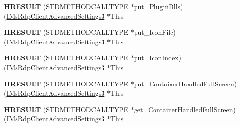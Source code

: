 \begin{DoxyCompactItemize}
\mbox{\label{struct_m_s_t_s_c_lib_1_1_i_ms_rdp_client_advanced_settings3_vtbl_a991d044da481aa66d441ab016e693aa0}} 
{\bfseries H\+R\+E\+S\+U\+LT} (S\+T\+D\+M\+E\+T\+H\+O\+D\+C\+A\+L\+L\+T\+Y\+PE $\ast$put\+\_\+\+Plugin\+Dlls)(\hyperlink{interface_m_s_t_s_c_lib_1_1_i_ms_rdp_client_advanced_settings3}{I\+Ms\+Rdp\+Client\+Advanced\+Settings3} $\ast$This
\item 
\mbox{\label{struct_m_s_t_s_c_lib_1_1_i_ms_rdp_client_advanced_settings3_vtbl_abd54c17c0d1fa735cb1f1632259a6b8c}} 
{\bfseries H\+R\+E\+S\+U\+LT} (S\+T\+D\+M\+E\+T\+H\+O\+D\+C\+A\+L\+L\+T\+Y\+PE $\ast$put\+\_\+\+Icon\+File)(\hyperlink{interface_m_s_t_s_c_lib_1_1_i_ms_rdp_client_advanced_settings3}{I\+Ms\+Rdp\+Client\+Advanced\+Settings3} $\ast$This
\item 
\mbox{\label{struct_m_s_t_s_c_lib_1_1_i_ms_rdp_client_advanced_settings3_vtbl_a56797f9c90c4ff54afe4b70c8f2ef3b1}} 
{\bfseries H\+R\+E\+S\+U\+LT} (S\+T\+D\+M\+E\+T\+H\+O\+D\+C\+A\+L\+L\+T\+Y\+PE $\ast$put\+\_\+\+Icon\+Index)(\hyperlink{interface_m_s_t_s_c_lib_1_1_i_ms_rdp_client_advanced_settings3}{I\+Ms\+Rdp\+Client\+Advanced\+Settings3} $\ast$This
\item 
\mbox{\label{struct_m_s_t_s_c_lib_1_1_i_ms_rdp_client_advanced_settings3_vtbl_aa78499912d7917d5bed73ad6a76cec8a}} 
{\bfseries H\+R\+E\+S\+U\+LT} (S\+T\+D\+M\+E\+T\+H\+O\+D\+C\+A\+L\+L\+T\+Y\+PE $\ast$put\+\_\+\+Container\+Handled\+Full\+Screen)(\hyperlink{interface_m_s_t_s_c_lib_1_1_i_ms_rdp_client_advanced_settings3}{I\+Ms\+Rdp\+Client\+Advanced\+Settings3} $\ast$This
\item 
\mbox{\label{struct_m_s_t_s_c_lib_1_1_i_ms_rdp_client_advanced_settings3_vtbl_a9b5c470bea54c20d3b561f62c847c952}} 
{\bfseries H\+R\+E\+S\+U\+LT} (S\+T\+D\+M\+E\+T\+H\+O\+D\+C\+A\+L\+L\+T\+Y\+PE $\ast$get\+\_\+\+Container\+Handled\+Full\+Screen)(\hyperlink{interface_m_s_t_s_c_lib_1_1_i_ms_rdp_client_advanced_settings3}{I\+Ms\+Rdp\+Client\+Advanced\+Settings3} $\ast$This
\item 
\mbox{\label{struct_m_s_t_s_c_lib_1_1_i_ms_rdp_client_advanced_settings3_vtbl_a4cf66597e68ab0ace7c6363c8aa19ded}} 

\end{DoxyCompactItemize}
